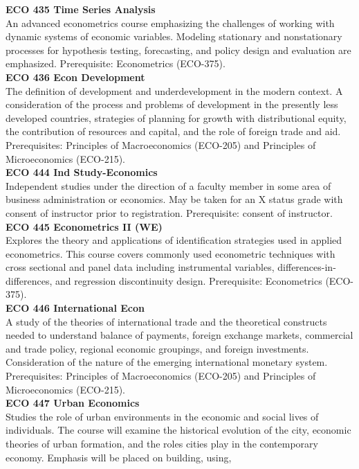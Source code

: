\documentclass[
  letterpaper,
]{scrbook}
\begin{document}
\textbf{ECO 435 Time Series Analysis}\\
An advanced econometrics course emphasizing the challenges of working
with dynamic systems of economic variables. Modeling stationary and
nonstationary processes for hypothesis testing, forecasting, and policy
design and evaluation are emphasized. Prerequisite: Econometrics
(ECO-375).\\
\textbf{ECO 436 Econ Development}\\
The definition of development and underdevelopment in the modern
context. A consideration of the process and problems of development in
the presently less developed countries, strategies of planning for
growth with distributional equity, the contribution of resources and
capital, and the role of foreign trade and aid. Prerequisites:
Principles of Macroeconomics (ECO-205) and Principles of Microeconomics
(ECO-215).\\
\textbf{ECO 444 Ind Study-Economics}\\
Independent studies under the direction of a faculty member in some area
of business administration or economics. May be taken for an X status
grade with consent of instructor prior to registration. Prerequisite:
consent of instructor.\\
\textbf{ECO 445 Econometrics II (WE)}\\
Explores the theory and applications of identification strategies used
in applied econometrics. This course covers commonly used econometric
techniques with cross sectional and panel data including instrumental
variables, differences-in-differences, and regression discontinuity
design. Prerequisite: Econometrics (ECO-375).\\
\textbf{ECO 446 International Econ}\\
A study of the theories of international trade and the theoretical
constructs needed to understand balance of payments, foreign exchange
markets, commercial and trade policy, regional economic groupings, and
foreign investments. Consideration of the nature of the emerging
international monetary system. Prerequisites: Principles of
Macroeconomics (ECO-205) and Principles of Microeconomics (ECO-215).\\
\textbf{ECO 447 Urban Economics}\\
Studies the role of urban environments in the economic and social lives
of individuals. The course will examine the historical evolution of the
city, economic theories of urban formation, and the roles cities play in
the contemporary economy. Emphasis will be placed on building, using,
\end{document}

